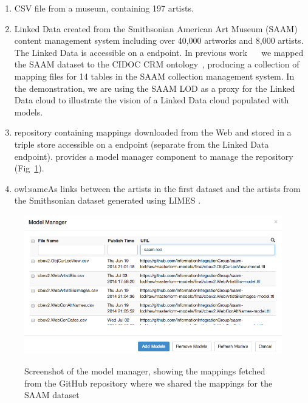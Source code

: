 \begin{enumerate}
\item CSV file from a museum, containing 197 artists. %

\item Linked Data created from the Smithsonian American Art Museum (SAAM) content management system including over 40,000 artworks and 8,000 artists. 
The Linked Data is accessible on a \sparql endpoint.
In previous work~\cite{Szekely:2013vq} ~ we mapped the SAAM dataset to the CIDOC CRM ontology~\cite{Doerr:2003:CCR:958671.958678}, producing a collection of \rtworml mapping files for 14 tables in the SAAM collection management system.
In the demonstration, we are using the SAAM LOD as a proxy for the Linked Data cloud to illustrate the vision of a Linked Data cloud populated with \rtworml models.

\item \rtworml repository containing \rtworml mappings downloaded from the Web and stored in a triple store accessible on a \sparql endpoint (separate from the Linked Data endpoint).
\karma provides a model manager component to manage the \rtworml repository (Fig~\ref{fig:model-manager-screenshot}).

\item owl:sameAs links between the artists in the first dataset and the artists from the Smithsonian dataset generated using LIMES \cite{ngomo2011limes}.

\end{enumerate}
\begin{figure}[bth]
\begin{center}
\includegraphics[width=4.8in]{images/3-model-manager.png}
\vspace{-3mm}
\caption{Screenshot of the model manager, showing the \rtworml mappings fetched from the GitHub repository where we shared the mappings for the SAAM dataset}
\vspace{-2mm}
\label{fig:model-manager-screenshot}
\end{center}
\vspace{-1.5em}
\end{figure}